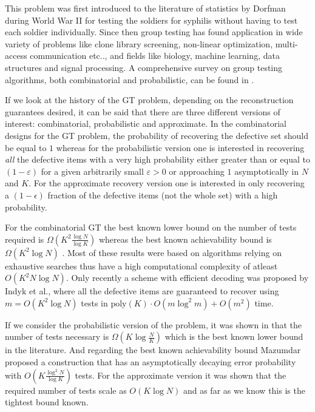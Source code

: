 \documentclass[conference,,twocolumn]{IEEEtran}
\begin{document}
This problem was first introduced to the literature of statistics by Dorfman \cite{dorfman1943detection} during World War II for testing the soldiers for syphilis without having to test each soldier individually. Since then group testing has found application in wide variety of problems like clone library screening, non-linear optimization, multi-access communication etc.., \cite{du1999combinatorial} and fields like biology\cite{chen2008survey}, machine learning\cite{malioutov2013exact}, data structures\cite{goodrich2005indexing} and signal processing\cite{emad2014poisson}. A comprehensive survey on group testing algorithms, both combinatorial and probabilistic, can be found in \cite{du1999combinatorial,chan2014non,atia2012boolean}. 

If we look at the history of the GT problem, depending on the reconstruction guarantees desired, it can be said that there are three different versions of interest: combinatorial, probabilistic and approximate. In the combinatorial designs for the GT problem, the probability of recovering the defective set should be equal to $1$ whereas for the probabilistic version one is interested in recovering \textit{all} the defective items with a very high probability either greater than or equal to $(1-\varepsilon)$ for a given arbitrarily small $\varepsilon>0$ or approaching $1$ asymptotically in $N$ and $K$. For the approximate recovery version one is interested in only recovering a $(1-\epsilon)$ fraction of the defective items (not the whole set) with a high probability.

For the combinatorial GT the best known lower bound on the number of tests required is $\Omega(K^2\frac{\log N}{\log K})$ \cite{d1982bounds,erdos1985families} whereas the best known achievability bound is $\Omega(K^2 \log N)$ \cite{kautz1964nonrandom,porat2011explicit}. Most of these results were based on algorithms relying on exhaustive searches thus have a high computational complexity of atleast $O(K^2 N\log N)$. Only recently a scheme with efficient decoding was proposed by Indyk et al., \cite{indyk2010efficiently} where all the defective items are guaranteed to recover using $m=O(K^2\log N)$ tests in $\text{poly}(K)\cdot O(m \log^2 m )+O(m^2)$ time. 

If we consider the probabilistic version of the problem, it was shown in \cite{chan2014non,atia2012boolean} that the number of tests
necessary is $\Omega(K\log \frac{N}{K})$ which is the best known lower bound in the literature. And regarding the best known achievability bound Mazumdar \cite{mazumdar2015nonadaptive} proposed a construction that has an asymptotically decaying error probability with $O(K\frac{\log^2 N}{\log K})$ tests. For the approximate version it was shown \cite{atia2012boolean} that the required number of tests scale as $O(K\log N)$ and as far as we know this is the tightest bound known.
\end{document}
